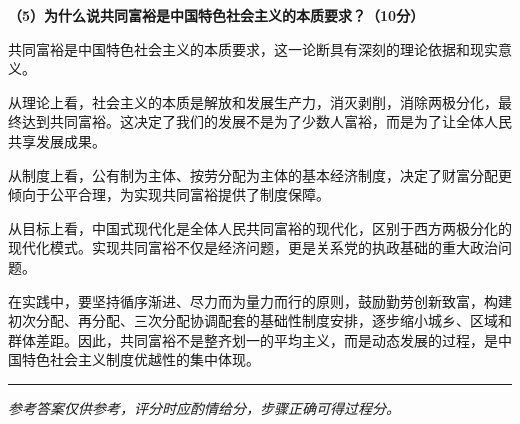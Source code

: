 \documentclass[12pt, a4paper]{article}
\newcommand{\examrule}{\noindent\rule{\linewidth}{0.6pt}}
\begin{document}
\begin{answerbox}
\textbf{（5）为什么说共同富裕是中国特色社会主义的本质要求？（10分）}

共同富裕是中国特色社会主义的本质要求，这一论断具有深刻的理论依据和现实意义。  

从理论上看，社会主义的本质是解放和发展生产力，消灭剥削，消除两极分化，最终达到共同富裕。这决定了我们的发展不是为了少数人富裕，而是为了让全体人民共享发展成果。  

从制度上看，公有制为主体、按劳分配为主体的基本经济制度，决定了财富分配更倾向于公平合理，为实现共同富裕提供了制度保障。  

从目标上看，中国式现代化是全体人民共同富裕的现代化，区别于西方两极分化的现代化模式。实现共同富裕不仅是经济问题，更是关系党的执政基础的重大政治问题。  

在实践中，要坚持循序渐进、尽力而为量力而行的原则，鼓励勤劳创新致富，构建初次分配、再分配、三次分配协调配套的基础性制度安排，逐步缩小城乡、区域和群体差距。因此，共同富裕不是整齐划一的平均主义，而是动态发展的过程，是中国特色社会主义制度优越性的集中体现。
\end{answerbox}

\vspace{12pt}
\examrule
\begin{center}
  \textit{参考答案仅供参考，评分时应酌情给分，步骤正确可得过程分。}
\end{center}
\end{document}
